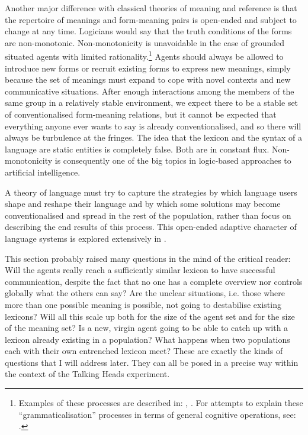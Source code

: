 Another major difference with classical theories of 
meaning and reference is 
that the repertoire of meanings and form-meaning pairs is open-ended
and subject to change at any time. Logicians would say that the 
truth conditions of the forms are non-monotonic. 
Non-monotonicity is unavoidable in the case of grounded 
situated agents with limited rationality.\footnote{
Examples of these processes are described in: 
\cite{Bybee:1994}, \cite{Traugott:1991}.
For attempts to explain these ``grammaticalisation'' 
processes in terms of general cognitive operations, see: 
\cite{Heine:1997}.}
Agents should always be allowed to 
introduce new forms or recruit existing forms to express new
meanings, simply because the set of meanings must expand
to cope with novel contexts and new communicative
situations. After enough interactions among the 
members of the same group in a relatively stable 
environment, we expect there to be
a stable set of conventionalised form-meaning 
relations, but it cannot be
expected that everything anyone ever wants to say is
already conventionalised, and so there will always
be turbulence at the fringes. The idea that the lexicon
and the syntax of a language are static
entities is completely false. Both are in constant flux.
Non-monotonicity is consequently one of the big 
topics in logic-based approaches to artificial intelligence.

A theory of language must try 
to capture the strategies by which language users shape and 
reshape their language and by which some solutions may become 
conventionalised and spread in the rest of the population, 
rather than focus on describing the end results of 
this process. This open-ended adaptive character of 
language systems is explored extensively in . 

This section probably raised many questions in the 
mind of the critical reader: Will the agents really 
reach a sufficiently similar lexicon to have successful 
communication, despite the fact that no one has a 
complete overview nor controls globally what the others
can say? Are the unclear situations, i.e. those
where more than one possible meaning is possible, not 
going to destabilise existing lexicons? Will all this 
scale up both for the size of the agent set and for 
the size of the meaning set? Is a new, virgin agent 
going to be able to catch up with a lexicon already 
existing in a population? What happens when two 
populations each with their own entrenched lexicon meet? 
These are exactly the kinds of questions that I will 
address later. They can all be posed in a precise 
way within the context of the Talking Heads experiment.

